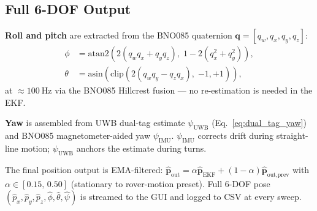 \subsection{Full 6-DOF Output}

\textbf{Roll and pitch} are extracted from the BNO085 quaternion
$\mathbf{q} = [q_w, q_x, q_y, q_z]$:
\begin{align}
  \phi  &= \mathrm{atan2}(2(q_w q_x + q_y q_z),\; 1 - 2(q_x^2+q_y^2)), \\
  \theta &= \mathrm{asin}(\mathrm{clip}(2(q_w q_y - q_z q_x),\;{-1},{+1})),
\end{align}
at $\approx\SI{100}{\hertz}$ via the BNO085 Hillcrest fusion --- no
re-estimation is needed in the EKF.

\textbf{Yaw} is assembled from UWB dual-tag estimate
$\psi_\text{UWB}$ (Eq.~\ref{eq:dual_tag_yaw}) and BNO085 magnetometer-aided
yaw $\psi_\text{IMU}$.
$\psi_\text{IMU}$ corrects drift during straight-line motion;
$\psi_\text{UWB}$ anchors the estimate during turns.

The final position output is EMA-filtered:
$\hat{\mathbf{p}}_\text{out} = \alpha\hat{\mathbf{p}}_\text{EKF}
+ (1-\alpha)\hat{\mathbf{p}}_\text{out,prev}$
with $\alpha \in [0.15,\,0.50]$ (stationary to rover-motion preset).
Full 6-DOF pose $(\hat{p}_x, \hat{p}_y, \hat{p}_z, \hat{\phi}, \hat{\theta}, \hat{\psi})$
is streamed to the GUI and logged to CSV at every sweep.
